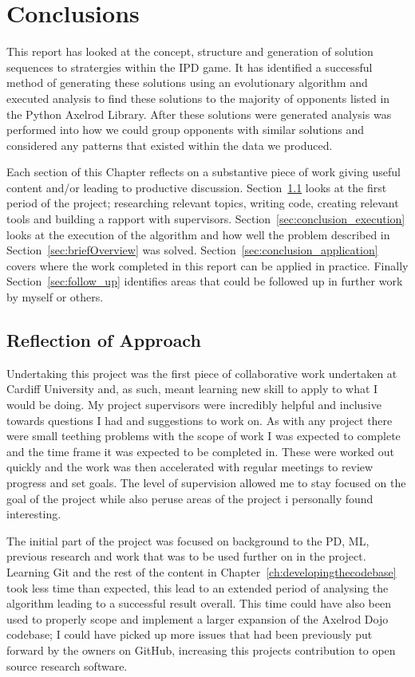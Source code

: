 \chapter{Conclusions}\label{ch:conclusions}
This report has looked at the concept, structure and generation of solution sequences to stratergies within the IPD game. 
It has identified a successful method of generating these solutions using an evolutionary algorithm and executed analysis to find these solutions to the majority of opponents listed in the Python Axelrod Library. 
After these solutions were generated analysis was performed into how we could group opponents with similar solutions and considered any patterns that existed within the data we produced.

Each section of this Chapter reflects on a substantive piece of work giving useful content and/or leading to productive discussion.
Section~\ref{sec:conclusion_approach} looks at the first period of the project; researching relevant topics,  writing code, creating relevant tools and building a rapport with supervisors.
Section~\ref{sec:conclusion_execution} looks at the execution of the algorithm and how well the problem described in Section~\ref{sec:briefOverview} was solved.
Section~\ref{sec:conclusion_application} covers where the work completed in this report can be applied in practice.
Finally Section~\ref{sec:follow_up} identifies areas that could be followed up in further work by myself or others.

\section{Reflection of Approach}\label{sec:conclusion_approach}
Undertaking this project was the first piece of collaborative work undertaken at Cardiff University and, as such, meant learning new skill to apply to what I would be doing.
My project supervisors were incredibly helpful and inclusive towards questions I had and suggestions to work on.
As with any project there were small teething problems with the scope of work I was expected to complete and the time frame it was expected to be completed in.
These were worked out quickly and the work was then accelerated with regular meetings to review progress and set goals.
The level of supervision allowed me to stay focused on the goal of the project while also peruse areas of the project i personally found interesting.

The initial part of the project was focused on background to the PD, ML, previous research and work that was to be used further on in the project. 
Learning Git and the rest of the content in Chapter~\ref{ch:developingthecodebase} took less time than expected, this lead to an extended period of analysing the algorithm leading to a successful result overall. 
This time could have also been used to properly scope and implement a larger expansion of the Axelrod Dojo codebase; I could have picked up more issues that had been previously put forward by the owners on GitHub, increasing this projects contribution to open source research software.


